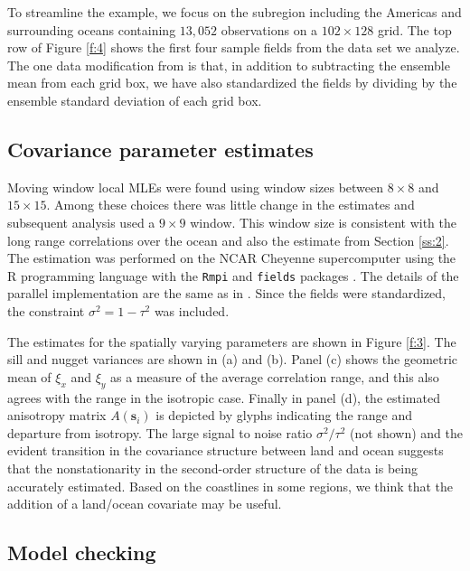 \documentclass[review]{elsarticle}
\begin{document}
To streamline the example, we focus on the subregion including the Americas and surrounding oceans containing $13,052$ observations on a $102 \times 128$ grid. The top row of Figure \ref{f:4} shows the first four sample fields from the data set we analyze. The one data modification from \cite{nychka2018modeling} is that, in addition to subtracting the ensemble mean from each grid box, we have also standardized the fields by dividing by the ensemble standard deviation of each grid box.

\subsection{Covariance parameter estimates}

 Moving window local MLEs were found using  window sizes between $8 \times 8$ and $15 \times 15$. Among these choices there was little change in the estimates and subsequent analysis used a $9 \times 9$ window. This window size is consistent with the long range correlations over the ocean and also the estimate from Section \ref{ss:2}. The estimation was performed on the NCAR Cheyenne supercomputer \cite{cheyenne} using the R programming language \cite{Rcore} with the \texttt{Rmpi} \cite{yu2002rmpi} and \texttt{fields} packages \cite{fields}. The details of the parallel implementation are the same as in \cite{nychka2018modeling}. Since the fields were standardized, the constraint $\sigma^2 = 1 - \tau^2$ was included. 

The estimates for the spatially varying parameters are shown in Figure \ref{f:3}. The sill and nugget variances are shown in (a) and (b). Panel (c) shows the geometric mean of $\xi_x$ and $\xi_y$ as a measure of the average correlation range, and this also agrees with the range in the isotropic case. Finally in panel (d), the estimated anisotropy matrix $A(\mathbf s_i)$ is depicted by glyphs indicating the range and departure from isotropy. 
The large signal to noise ratio $\sigma^2/\tau^2$ (not shown) and the evident transition in the covariance structure between land and ocean suggests that the nonstationarity in the second-order structure of the data is being accurately estimated. Based on the coastlines in some regions, we think that the addition of a land/ocean covariate may be useful.



\subsection{Model checking}
\end{document}
